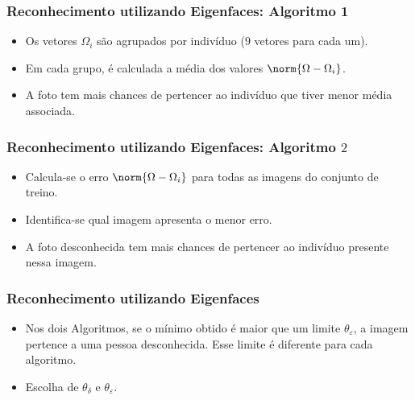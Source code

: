 \documentclass[15pt]{beamer}
\begin{document}
\begin{frame}
    \frametitle{Reconhecimento utilizando Eigenfaces: Algoritmo 1}

    \begin{itemize}
        \item<1-> Os vetores \( \Omega_{ i } \) são agrupados por indivíduo (\( 9 \) vetores para cada um).
        \item<2-> Em cada grupo, é calculada a média dos valores \( \norm{ \Omega - \Omega_{ i } } \).
        \item<3-> A foto tem mais chances de pertencer ao indivíduo que tiver menor média associada.
    \end{itemize}

\end{frame}

\begin{frame}
    \frametitle{Reconhecimento utilizando Eigenfaces: Algoritmo \( 2 \)}

    \begin{itemize}
        \item<1-> Calcula-se o erro \( \norm{ \Omega - \Omega_{ i } } \) para todas as imagens do conjunto de treino.
        \item<2-> Identifica-se qual imagem apresenta o menor erro.
        \item<3-> A foto desconhecida tem mais chances de pertencer ao indivíduo presente nessa imagem.
    \end{itemize}

\end{frame}

\begin{frame}
    \frametitle{Reconhecimento utilizando Eigenfaces}

    \begin{itemize}
        \item<1- > Nos dois Algoritmos, se o mínimo obtido é maior que um limite \( \theta_{ \varepsilon } \), a imagem pertence a uma pessoa desconhecida.
            Esse limite é diferente para cada algoritmo.
        \item<2-> Escolha de \( \theta_{ \delta } \) e \( \theta_{ \varepsilon } \).
    \end{itemize}

\end{frame}
\end{document}
